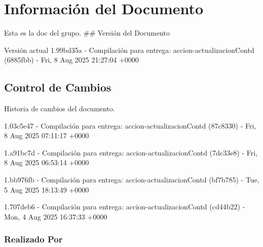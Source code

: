 \documentclass[
	a4paper, %
	12pt, %
]{include/CSSullivanBusinessReport}
\begin{document}
\newpage

\begin{twothirdswidth} %
	\tableofcontents %
\end{twothirdswidth}

\newpage


\newpage

\section{Información del
Documento}\label{sec:informaciuxf3n-del-documento}

Esta es la doc del grupo. \#\# Versión del Documento

\begin{quote}
\end{quote}

Versión actual 1.99bd35a - Compilación para entrega:
accion-actualizacionContd (6885fbb) - Fri, 8 Aug 2025 21:27:04 +0000

\subsection{Control de Cambios}\label{sec:control-de-cambios}

Historia de cambios del documento.

1.03c5e47 - Compilación para entrega: accion-actualizacionContd
(87c8330) - Fri, 8 Aug 2025 07:11:17 +0000

1.a91bc7d - Compilación para entrega: accion-actualizacionContd
(7dc33e8) - Fri, 8 Aug 2025 06:53:14 +0000

1.bb976fb - Compilación para entrega: accion-actualizacionContd
(bf7b785) - Tue, 5 Aug 2025 18:13:49 +0000

1.707deb6 - Compilación para entrega: accion-actualizacionContd
(cd44b22) - Mon, 4 Aug 2025 16:37:33 +0000

\subsubsection{Realizado Por}\label{sec:realizado-por}
\end{document}

